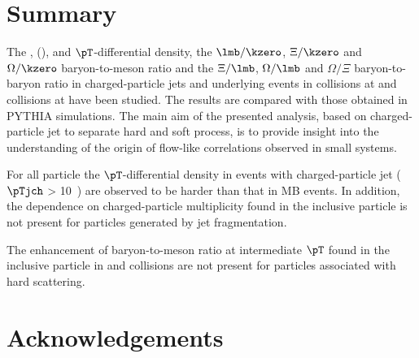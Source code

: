 \documentclass[ALICE,manyauthors]{cernphprep}
\begin{document}





\clearpage
\section{Summary}%
\label{sec:Summary}

The \kzero, \lmb (\almb), \Xis and \Oms $\pT$-differential density, the $\lmb/\kzero$, $\Xi/\kzero$ and $\Omega/\kzero$ baryon-to-meson ratio and the $\Xi/\lmb$, $\Omega/\lmb$ and $\Omega/\Xi$ baryon-to-baryon ratio in charged-particle jets and underlying events in \pp collisions at \thirteen and \pPb collisions at \fivenn have been studied.
The results are compared with those obtained in PYTHIA simulations.
The main aim of the presented analysis, based on charged-particle jet to separate hard and soft process, is to provide insight into the understanding of the origin of flow-like correlations observed in small systems.

For all particle the $\pT$-differential density in events with charged-particle jet ($\pTjch$ > 10~\GeVc) are observed to be harder than that in MB events.
In addition, the dependence on charged-particle multiplicity found in the inclusive particle is not present for particles generated by jet fragmentation.

The enhancement of baryon-to-meson ratio at intermediate $\pT$ found in the inclusive particle in \pp and \pPb collisions are not present for particles associated with hard scattering.

\newenvironment{acknowledgement}{\relax}{\relax}
\begin{acknowledgement}
\section*{Acknowledgements}
%

\end{acknowledgement}
\end{document}
